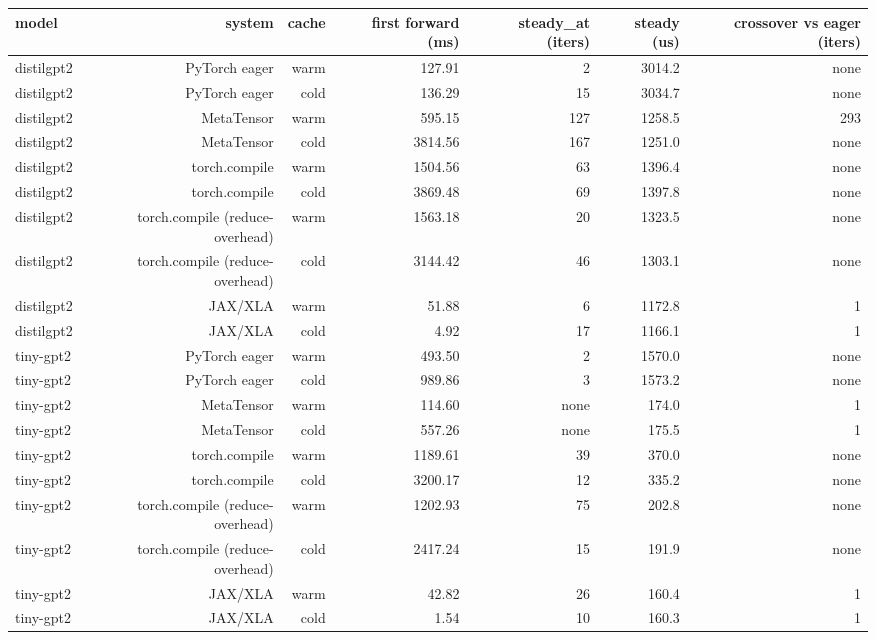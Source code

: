 \begin{tabular}{lrrrrrr}
\toprule
model & system & cache & first forward (ms) & steady\_at (iters) & steady (us) & crossover vs eager (iters) \\
\midrule
distilgpt2 & PyTorch eager & warm & 127.91 & 2 & 3014.2 & none \\
distilgpt2 & PyTorch eager & cold & 136.29 & 15 & 3034.7 & none \\
distilgpt2 & MetaTensor & warm & 595.15 & 127 & 1258.5 & 293 \\
distilgpt2 & MetaTensor & cold & 3814.56 & 167 & 1251.0 & none \\
distilgpt2 & torch.compile & warm & 1504.56 & 63 & 1396.4 & none \\
distilgpt2 & torch.compile & cold & 3869.48 & 69 & 1397.8 & none \\
distilgpt2 & torch.compile (reduce-overhead) & warm & 1563.18 & 20 & 1323.5 & none \\
distilgpt2 & torch.compile (reduce-overhead) & cold & 3144.42 & 46 & 1303.1 & none \\
distilgpt2 & JAX/XLA & warm & 51.88 & 6 & 1172.8 & 1 \\
distilgpt2 & JAX/XLA & cold & 4.92 & 17 & 1166.1 & 1 \\
tiny-gpt2 & PyTorch eager & warm & 493.50 & 2 & 1570.0 & none \\
tiny-gpt2 & PyTorch eager & cold & 989.86 & 3 & 1573.2 & none \\
tiny-gpt2 & MetaTensor & warm & 114.60 & none & 174.0 & 1 \\
tiny-gpt2 & MetaTensor & cold & 557.26 & none & 175.5 & 1 \\
tiny-gpt2 & torch.compile & warm & 1189.61 & 39 & 370.0 & none \\
tiny-gpt2 & torch.compile & cold & 3200.17 & 12 & 335.2 & none \\
tiny-gpt2 & torch.compile (reduce-overhead) & warm & 1202.93 & 75 & 202.8 & none \\
tiny-gpt2 & torch.compile (reduce-overhead) & cold & 2417.24 & 15 & 191.9 & none \\
tiny-gpt2 & JAX/XLA & warm & 42.82 & 26 & 160.4 & 1 \\
tiny-gpt2 & JAX/XLA & cold & 1.54 & 10 & 160.3 & 1 \\
\bottomrule
\end{tabular}
